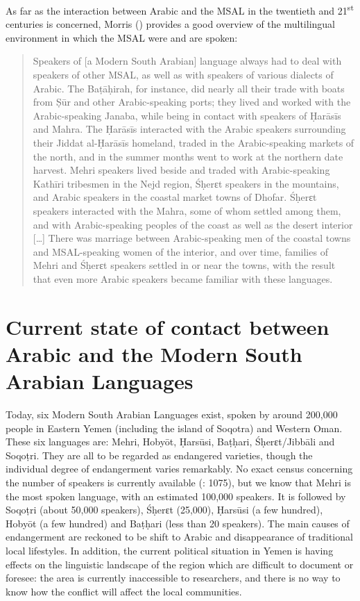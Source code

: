 \documentclass[output=paper]{langsci/langscibook}
\begin{document}
As far as the interaction between Arabic and the MSAL in the twentieth and 21\textsuperscript{st} centuries is concerned, Morris (\citeyear[25]{Morris2017}) provides a good overview of the multilingual environment in which the MSAL were and are spoken: 

\begin{quote}
Speakers of [a Modern South Arabian] language always had to deal with speakers of other MSAL, as well as with speakers of various dialects of Arabic. The Baṭāḥirah, for instance, did nearly all their trade with boats from Ṣūr and other Arabic-speaking ports; they lived and worked with the Arabic-speaking Janaba, while being in contact with speakers of Ḥarāsīs and Mahra. The Ḥarāsīs interacted with the Arabic speakers surrounding their Jiddat al-Ḥarāsīs homeland, traded in the Arabic-speaking markets of the north, and in the summer months went to work at the northern date harvest. Mehri speakers lived beside and traded with Arabic-speaking Kathīri tribesmen in the Nejd region, Śḥerɛt speakers in the mountains, and Arabic speakers in the coastal market towns of Dhofar. Śḥerɛt speakers interacted with the Mahra, some of whom settled among them, and with Arabic-speaking peoples of the coast as well as the desert interior […] There was marriage between Arabic-speaking men of the coastal towns and MSAL-speaking women of the interior, and over time, families of Mehri and Śḥerɛt speakers settled in or near the towns, with the result that even more Arabic speakers became familiar with these languages.
\end{quote}

\section{Current state of contact between Arabic and the Modern South Arabian Languages}\label{sec:2}

Today, six Modern South Arabian Languages exist, spoken by around 200,000 people in Eastern Yemen (including the island of Soqotra) and Western Oman. These six languages are: Mehri, Hobyōt, Ḥarsūsi, Baṭḥari, Śḥerɛt/Jibbāli and Soqoṭri. They are all to be regarded as endangered varieties, though the individual degree of endangerment varies remarkably. No exact census concerning the number of speakers is currently available (\citealt{Simeone-Senelle2011}: 1075), but we know that Mehri is the most spoken language, with an estimated 100,000 speakers. It is followed by Soqoṭri (about 50,000 speakers), Śḥerɛt (25,000), Ḥarsūsi (a few hundred), Hobyōt (a few hundred) and Baṭḥari (less than 20 speakers). The main causes of endangerment are reckoned to be shift to Arabic and disappearance of traditional local lifestyles. In addition, the current political situation in Yemen is having effects on the linguistic landscape of the region which are difficult to document or foresee: the area is currently inaccessible to researchers, and there is no way to know how the conflict will affect the local communities.
\end{document}
